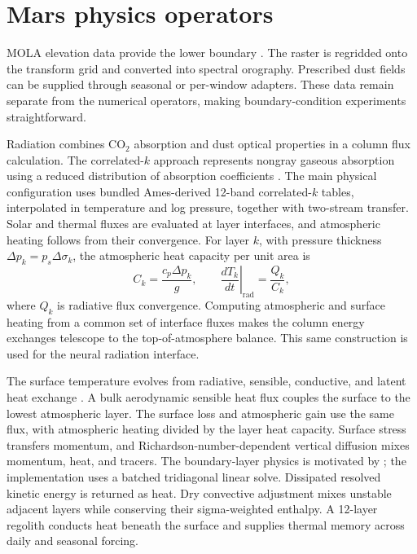 \documentclass{article} %
\newcommand{\co}{CO$_2$}
\begin{document}





\appendix
\section{Mars physics operators}\label{app:physics}

MOLA elevation data provide the lower boundary \citep{smith2001,mola}. The raster is regridded onto the transform grid and converted into spectral orography. Prescribed dust fields can be supplied through seasonal or per-window adapters. These data remain separate from the numerical operators, making boundary-condition experiments straightforward.

Radiation combines \co{} absorption and dust optical properties in a column flux calculation. The correlated-$k$ approach represents nongray gaseous absorption using a reduced distribution of absorption coefficients \citep{lacis1991}. The main physical configuration uses bundled Ames-derived 12-band correlated-$k$ tables, interpolated in temperature and log pressure, together with two-stream transfer. Solar and thermal fluxes are evaluated at layer interfaces, and atmospheric heating follows from their convergence. For layer $k$, with pressure thickness $\Delta p_k=p_s\Delta\sigma_k$, the atmospheric heat capacity per unit area is
\begin{equation}
 C_k=\frac{c_p\Delta p_k}{g},\qquad
 \left.\frac{dT_k}{dt}\right|_{\mathrm{rad}}=\frac{Q_k}{C_k},
\end{equation}
where $Q_k$ is radiative flux convergence. Computing atmospheric and surface heating from a common set of interface fluxes makes the column energy exchanges telescope to the top-of-atmosphere balance. This same construction is used for the neural radiation interface.

The surface temperature evolves from radiative, sensible, conductive, and latent heat exchange \citep{forget1999,haberle2019ames}. A bulk aerodynamic sensible heat flux couples the surface to the lowest atmospheric layer. The surface loss and atmospheric gain use the same flux, with atmospheric heating divided by the layer heat capacity. Surface stress transfers momentum, and Richardson-number-dependent vertical diffusion mixes momentum, heat, and tracers. The boundary-layer physics is motivated by \citet{petrosyan2011pbl}; the implementation uses a batched tridiagonal linear solve. Dissipated resolved kinetic energy is returned as heat. Dry convective adjustment mixes unstable adjacent layers while conserving their sigma-weighted enthalpy. A 12-layer regolith conducts heat beneath the surface and supplies thermal memory across daily and seasonal forcing.
\end{document}
